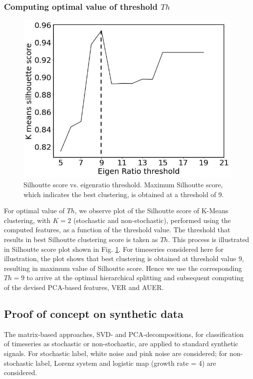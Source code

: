 \documentclass[journal]{IEEEtran}
\begin{document}
	\subsubsection{ Computing optimal value of threshold $Th$} \label{compute_threshold}

		\begin{figure}[ht]
		\centering
		\includegraphics[width=0.7\linewidth]{threshold.jpg}
		\caption{Silhoutte score vs. eigenratio threshold. Maximum Silhoutte score, which indicates the best clustering, is obtained at a threshold of 9.}
		\label{sill}
	\end{figure}


	 For optimal value of $Th$, we observe plot of the Silhoutte score of K-Means clustering, with $K=2$ (stochastic and non-stochastic), performed using the computed features, as a function of the threshold value. The threshold that results in best Silhoutte clustering score is taken as $Th$. This process is illustrated in Silhoutte score plot shown in Fig. \ref{sill}. For timeseries considered here for illustration, the plot shows that best clustering is obtained at threshold value 9, resulting in maximum value of Silhoutte score. Hence we use the corresponding $Th = 9$ to arrive at the optimal hierarchical splitting and subsequent computing of the devised PCA-based features, VER and AUER.

	\subsection{Proof of concept on synthetic data}
	The matrix-based approaches, SVD- and PCA-decompositions, for classification of timeseries as stochastic or non-stochastic, are applied to standard synthetic signals. For stochastic label, white noise and pink noise are considered; for non-stochastic label, Lorenz system and logistic map (growth rate = 4) are considered.
	
\end{document}
